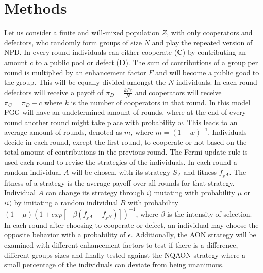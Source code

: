 \documentclass[letterpaper]{article}
\begin{document}
\section{Methods}
Let us consider a finite and will-mixed population $Z$, with only cooperators and defectors, who randomly form groups of size $N$ and play the repeated version of NPD. In every round individuals can either cooperate (\textbf{C}) by contributing an amount $c$ to a public pool or defect (\textbf{D}). The sum of contributions of a group per round is multiplied by an enhancement factor $F$ and will become a public good to the group. This will be equally divided amongst  the $N$ individuals. In each round defectors will receive a payoff of $\pi_{D}= \frac{kFc}{N}$  and cooperators will receive $\pi_{C}=\pi_{D}-c$ where $k$ is the number of cooperators in that round. In this model PGG will have an undetermined amount of rounds, where at the end of every round another round might take place with probability $w$. This leads to an average amount of rounds, denoted as $m$, where $m= (1-w)^{-1}$. Individuals decide in each round, except the first round, to cooperate or not based on the total amount of contributions in the previous round.
The Fermi update rule \citep{traulsen2006stochastic,grujic2014comparative} is used each round to revise the strategies of the individuals.
In each round a random individual $A$ will be chosen, with its strategy $S_{A}$ and fitness $f_{_S{A}}$. The fitness of a strategy is the average payoff over all rounds for that strategy. Individual $A$ can change its strategy through $i)$ mutating with probability $\mu$ or $ii)$ by imitating a random individual $B$ with probability $(1-\mu)(1+exp[-\beta(f_{_S{A}}-f_{_S{B}})])^{-1}$, where $\beta$ is the intensity of selection.
In each round after choosing to cooperate or defect, an individual may choose the opposite behavior with a probability of $\epsilon$.
Additionally, the AON strategy will be examined with different enhancement factors to test if there is a difference, different groups sizes and finally tested against the NQAON strategy where a small percentage of the individuals can deviate from being unanimous.
\end{document}
